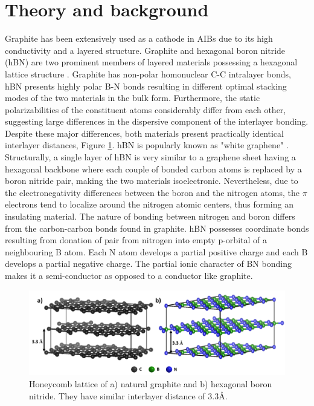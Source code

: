 \section{Theory and background}
Graphite has been extensively used as a cathode in AIBs due to its high conductivity and a layered structure. Graphite and hexagonal boron nitride (hBN) are two prominent members of layered materials possessing a hexagonal lattice structure \cite{hod_graphite_2012}. Graphite has non-polar homonuclear C-C intralayer bonds, hBN presents highly polar B-N bonds resulting in different optimal stacking modes of the two materials in the bulk form. Furthermore, the static polarizabilities of the constituent atoms considerably differ from each other, suggesting large differences in the dispersive component of the interlayer bonding. Despite these major differences, both materials present practically identical interlayer distances, Figure \ref{Figures/BOhBN:grpBNcomp}. hBN is popularly known as "white graphene" \cite{song_large_2010, zeng_white_2010}. Structurally, a single layer of hBN is very similar to a graphene sheet having a hexagonal backbone where each couple of bonded carbon atoms is replaced by a boron nitride pair, making the two materials isoelectronic. Nevertheless, due to the electronegativity differences between the boron and the nitrogen atoms, the $\pi$ electrons tend to localize around the nitrogen atomic centers, thus forming an insulating material. The nature of bonding between nitrogen and boron differs from the carbon-carbon bonds found in graphite. hBN possesses coordinate bonds resulting from donation of  pair from nitrogen into empty p-orbital of a neighbouring B atom. Each N atom develops a partial positive charge and each B develops a partial negative charge. The partial ionic character of BN bonding makes it a semi-conductor as opposed to a conductor like graphite. 
\begin{figure}[tbh!]
\centering
\includegraphics[width=\textwidth]{Figures/BOhBN/grpBNcomp}
\caption{Honeycomb lattice of a) natural graphite and b) hexagonal boron nitride. They have similar interlayer distance of 3.3\AA.}
\label{Figures/BOhBN:grpBNcomp}
\end{figure}
